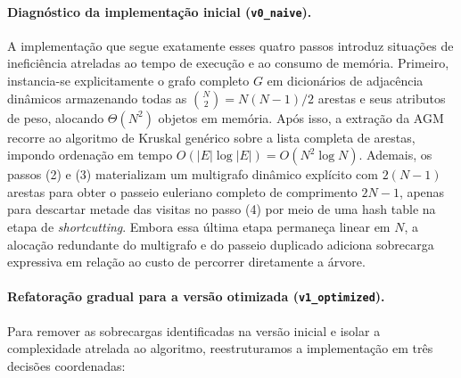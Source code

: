 \paragraph{Diagnóstico da implementação inicial (\texttt{v0\_naive}).}
A implementação que segue exatamente esses quatro passos introduz situações de ineficiência atreladas ao tempo de execução e ao consumo de memória.
Primeiro, instancia-se explicitamente o grafo completo $G$ em dicionários de adjacência
dinâmicos armazenando todas as $\binom{N}{2} = N(N-1)/2$ arestas e seus atributos de peso,
alocando $\Theta(N^2)$ objetos em memória. Após isso, a
extração da AGM recorre ao algoritmo de Kruskal genérico sobre a lista completa de arestas,
impondo ordenação em tempo $O(|E| \log |E|) = O(N^2 \log N)$. Ademais, os passos (2) e (3)
materializam um multigrafo dinâmico explícito com $2(N - 1)$ arestas para obter o passeio
euleriano completo de comprimento $2N - 1$, apenas para descartar metade das visitas no passo
(4) por meio de uma hash table na etapa de \textit{shortcutting}. Embora essa última
etapa permaneça linear em $N$, a alocação redundante do multigrafo e do passeio duplicado
adiciona sobrecarga expressiva em relação ao custo de percorrer diretamente a
árvore.

\paragraph{Refatoração gradual para a versão otimizada (\texttt{v1\_optimized}).}
Para remover as sobrecargas identificadas na versão inicial e isolar a complexidade atrelada
ao algoritmo, reestruturamos a implementação em três decisões coordenadas:

